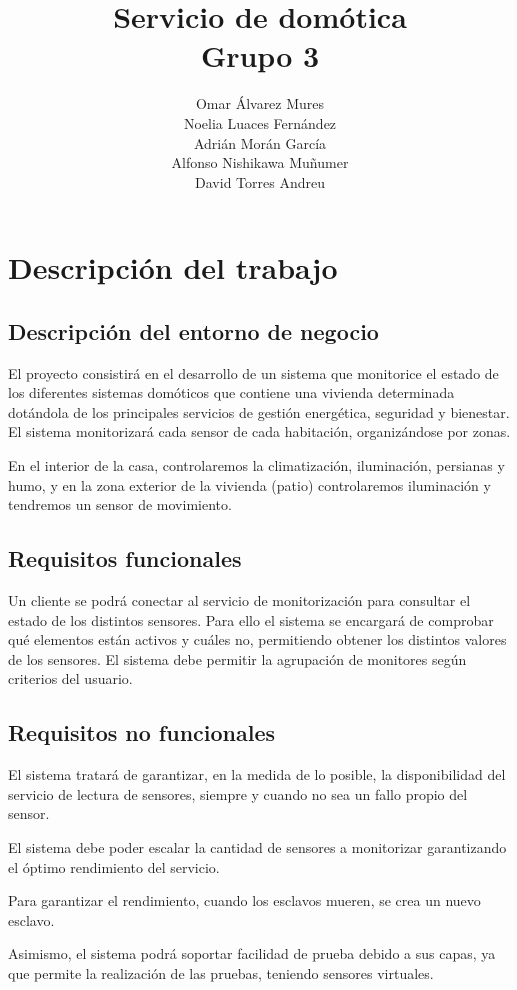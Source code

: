 \documentclass[a4paper,10pt]{article}
\title{Servicio de domótica\\ Grupo 3}
\author{Omar \'Alvarez Mures \\
	Noelia Luaces Fern\'andez \\
	Adri\'an Mor\'an Garc\'ia \\
	Alfonso Nishikawa Mu\~numer \\
	David Torres Andreu}
\date{}
\begin{document}
\maketitle

\newpage

\section{Descripción del trabajo}

\subsection{Descripción del entorno de negocio}
El proyecto consistirá en el desarrollo de un sistema que monitorice el 
estado de los diferentes sistemas domóticos que contiene una vivienda 
determinada dotándola de los principales servicios de gestión energética, 
seguridad y bienestar. El sistema monitorizará cada sensor de cada habitación, 
organizándose por zonas.

En el interior de la casa, controlaremos la climatización, iluminación, 
persianas y humo, y en la zona exterior de la vivienda (patio) controlaremos 
iluminación y tendremos un sensor de movimiento.

\subsection{Requisitos funcionales}
Un cliente se podrá conectar al servicio de monitorización para consultar el 
estado de los distintos sensores. Para ello el sistema se encargará de comprobar 
qué elementos están activos y cuáles no, permitiendo obtener los distintos 
valores de los sensores. El sistema debe permitir la agrupación de monitores 
según  criterios del usuario. 

\subsection{Requisitos no funcionales}
El sistema tratará de garantizar, en la medida de lo posible, la disponibilidad 
del servicio de lectura de sensores, siempre y cuando no sea un fallo propio del 
sensor.

El sistema debe poder escalar la cantidad de sensores a monitorizar garantizando 
el óptimo rendimiento del servicio.

Para garantizar el rendimiento, cuando los esclavos mueren, se crea un nuevo 
esclavo.

Asimismo, el sistema podrá soportar facilidad de prueba debido a sus capas, ya 
que permite la realización de las pruebas, teniendo sensores virtuales.
\end{document}
